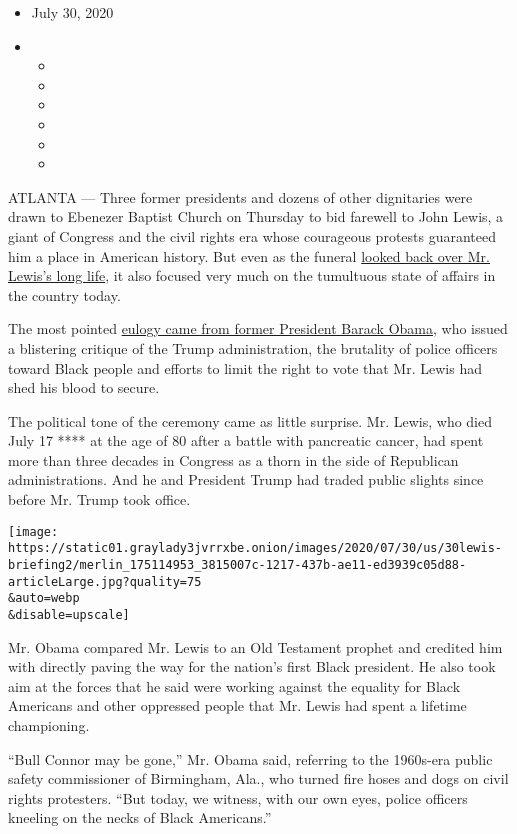 \begin{itemize}
\item
  July 30, 2020
\item
  \begin{itemize}
  \item
  \item
  \item
  \item
  \item
  \item
  \end{itemize}
\end{itemize}

ATLANTA --- Three former presidents and dozens of other dignitaries were
drawn to Ebenezer Baptist Church on Thursday to bid farewell to John
Lewis, a giant of Congress and the civil rights era whose courageous
protests guaranteed him a place in American history. But even as the
funeral
\href{https://www.nytimes3xbfgragh.onion/2020/07/17/us/john-lewis-dead.html}{looked
back over Mr. Lewis's long life}, it also focused very much on the
tumultuous state of affairs in the country today.

The most pointed
\href{https://www.nytimes3xbfgragh.onion/2020/07/30/us/obama-eulogy-john-lewis-full-transcript.html}{eulogy
came from former President Barack Obama}, who issued a blistering
critique of the Trump administration, the brutality of police officers
toward Black people and efforts to limit the right to vote that Mr.
Lewis had shed his blood to secure.

The political tone of the ceremony came as little surprise. Mr. Lewis,
who died July 17 **** at the age of 80 after a battle with pancreatic
cancer, had spent more than three decades in Congress as a thorn in the
side of Republican administrations. And he and President Trump had
traded public slights since before Mr. Trump took office.

\texttt{[image: https://static01.graylady3jvrrxbe.onion/images/2020/07/30/us/30lewis-briefing2/merlin\_175114953\_3815007c-1217-437b-ae11-ed3939c05d88-articleLarge.jpg?quality=75\\\&auto=webp\\\&disable=upscale]}

Mr. Obama compared Mr. Lewis to an Old Testament prophet and credited
him with directly paving the way for the nation's first Black president.
He also took aim at the forces that he said were working against the
equality for Black Americans and other oppressed people that Mr. Lewis
had spent a lifetime championing.

``Bull Connor may be gone,'' Mr. Obama said, referring to the 1960s-era
public safety commissioner of Birmingham, Ala., who turned fire hoses
and dogs on civil rights protesters. ``But today, we witness, with our
own eyes, police officers kneeling on the necks of Black Americans.''

